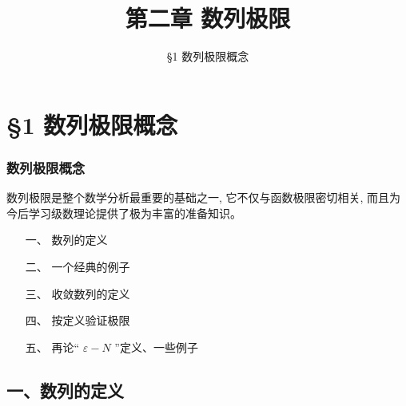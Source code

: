 \documentclass[mathserif]{beamer}
\title
{第二章 \qquad 数列极限}
\date{\sihao\S 1 \qquad 数列极限概念}
\begin{document}
	

	\setlength\abovedisplayskip{2pt}
	\setlength\belowdisplayskip{2pt}
	

\begin{frame}
\Background
\titlepage  %
\end{frame}





\begin{frame}
\tableofcontents
\end{frame}

\section{\S 1 数列极限概念}

\begin{frame}
\frametitle{数列极限概念}

\suojin 数列极限是整个数学分析最重要的基础之一, 它不仅与函数极限密切相关, 而且为今后学习级数理论提供了极为丰富的准备知识。

\begin{itemize}
	\item[一、] 数列的定义
	\item[二、] 一个经典的例子
	\item[三、] 收敛数列的定义
	\item[四、] 按定义验证极限
	\item[五、] 再论“ $\varepsilon-N$ ”定义、一些例子
\end{itemize} 
\end{frame}

\subsection{一、数列的定义}
\end{document}
